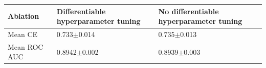 \begin{tabular}{lll}
\toprule
Ablation & Differentiable hyperparameter tuning & No differentiable hyperparameter tuning \\
\midrule
Mean CE      &                      0.733$\pm$0.014 &                        0.735$\pm$0.013 \\
Mean ROC AUC &                     0.8942$\pm$0.002 &                         0.8939$\pm$0.003 \\
\bottomrule
\end{tabular}
